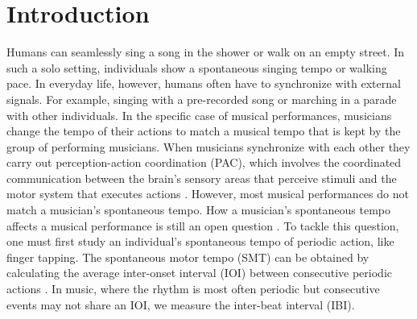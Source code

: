 \documentclass{report}
\begin{document}
\section{Introduction}
Humans can seamlessly sing a song in the shower or walk on an empty street. In such a solo setting, individuals show a spontaneous singing tempo or walking pace. In everyday life, however, humans often have to synchronize with external signals. For example, singing with a pre-recorded song or marching in a parade with other individuals. In the specific case of musical performances, musicians change the tempo of their actions to match a musical tempo that is kept by the group of performing musicians. When musicians synchronize with each other they carry out perception-action coordination (PAC), which involves the coordinated communication between the brain's sensory areas that perceive stimuli and the motor system that executes actions \cite{ridderinkhof2014neurocognitive}. However, most musical performances do not match a musician's spontaneous tempo. How a musician's spontaneous tempo affects a musical performance is still an open question \cite{zamm2018musicians}. To tackle this question, one must first study an individual's spontaneous tempo of periodic action, like finger tapping. The spontaneous motor tempo (SMT) can be obtained by calculating the average inter-onset interval (IOI) between consecutive periodic actions \cite{mcauley2006time}. In music, where the rhythm is most often periodic but consecutive events may not share an IOI, we measure the inter-beat interval (IBI). 
\end{document}
